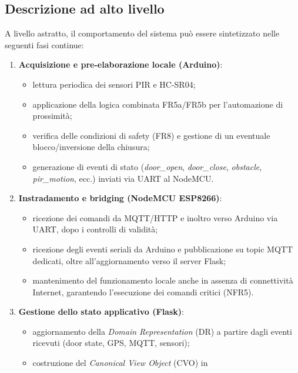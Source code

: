 \subsection{Descrizione ad alto livello}

A livello astratto, il comportamento del sistema può essere sintetizzato nelle
seguenti fasi continue:
\begin{enumerate}
  \item \textbf{Acquisizione e pre-elaborazione locale (Arduino)}:
        \begin{itemize}
          \item lettura periodica dei sensori PIR e HC-SR04;
          \item applicazione della logica combinata FR5a/FR5b per
                l’automazione di prossimità;
          \item verifica delle condizioni di safety (FR8) e gestione di un
                eventuale blocco/inversione della chiusura;
          \item generazione di eventi di stato (\textit{door\_open},
                \textit{door\_close}, \textit{obstacle}, \textit{pir\_motion},
                ecc.) inviati via UART al NodeMCU.
        \end{itemize}
  \item \textbf{Instradamento e bridging (NodeMCU ESP8266)}:
        \begin{itemize}
          \item ricezione dei comandi da MQTT/HTTP e inoltro verso Arduino via
                UART, dopo i controlli di validità;
          \item ricezione degli eventi seriali da Arduino e pubblicazione su
                topic MQTT dedicati, oltre all’aggiornamento verso il server
                Flask;
          \item mantenimento del funzionamento locale anche in assenza di
                connettività Internet, garantendo l’esecuzione dei comandi
                critici (NFR5).
        \end{itemize}
  \item \textbf{Gestione dello stato applicativo (Flask)}:
        \begin{itemize}
          \item aggiornamento della \textit{Domain Representation} (DR) a
                partire dagli eventi ricevuti (door state, GPS, MQTT, sensori);
          \item costruzione del \textit{Canonical View Object} (CVO) in

\end{itemize}
\end{enumerate}
